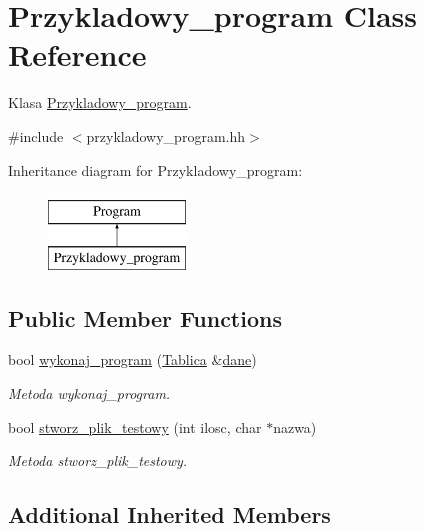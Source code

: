 \hypertarget{class_przykladowy__program}{\section{Przykladowy\+\_\+program Class Reference}
\label{class_przykladowy__program}
}


Klasa \hyperlink{class_przykladowy__program}{Przykladowy\+\_\+program}.  




{\ttfamily \#include $<$przykladowy\+\_\+program.\+hh$>$}

Inheritance diagram for Przykladowy\+\_\+program\+:\begin{figure}[H]
\begin{center}
\leavevmode
\includegraphics[height=2.000000cm]{class_przykladowy__program}
\end{center}
\end{figure}
\subsection*{Public Member Functions}
\begin{DoxyCompactItemize}
\item 
bool \hyperlink{class_przykladowy__program_a4215d5b5562be2a26f601dec4d4f6501}{wykonaj\+\_\+program} (\hyperlink{class_tablica}{Tablica} \&\hyperlink{class_program_ac27fc896de0e4c87cc6a17290c0930ef}{dane})
\begin{DoxyCompactList}\small\item\em Metoda wykonaj\+\_\+program. \end{DoxyCompactList}\item 
bool \hyperlink{class_przykladowy__program_a01cb33d6717d2dfd159f4607b7c8269f}{stworz\+\_\+plik\+\_\+testowy} (int ilosc, char $\ast$nazwa)
\begin{DoxyCompactList}\small\item\em Metoda stworz\+\_\+plik\+\_\+testowy. \end{DoxyCompactList}\end{DoxyCompactItemize}
\subsection*{Additional Inherited Members}


